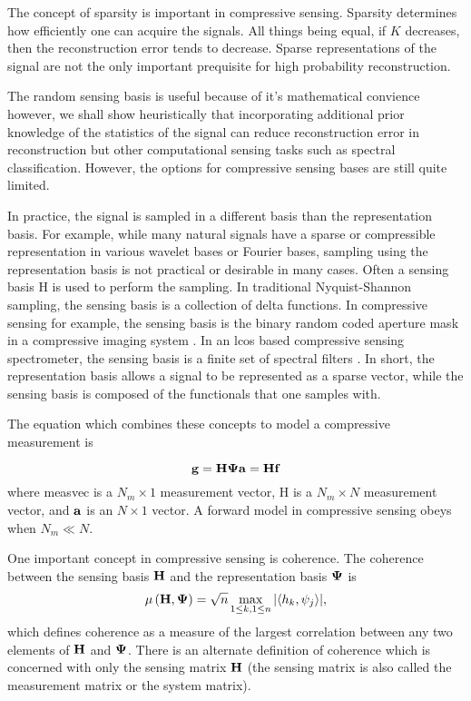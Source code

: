 The concept of \gls{sparsity} is important in compressive sensing. Sparsity determines how efficiently one can acquire the signals. All things being equal, if $K$ decreases, then the reconstruction error tends to decrease. Sparse representations of the signal are not the only important prequisite for high probability reconstruction.

The random sensing basis is useful because of it's mathematical convience however, we shall show heuristically that incorporating additional prior knowledge of the statistics of the signal can reduce reconstruction error in reconstruction but other computational sensing tasks such as spectral classification. However, the options for compressive sensing bases are still quite limited.

In practice, the signal is sampled in a different basis than the representation basis. For example, while many natural signals have a sparse or compressible representation in various wavelet bases or Fourier bases, sampling using the representation basis is not practical or desirable in many cases. Often a sensing basis \gls{H} is used to perform the sampling. In traditional Nyquist-Shannon sampling, the sensing basis is a collection of delta functions. In compressive sensing for example, the sensing basis is the binary random coded aperture mask in a compressive imaging system \cite{duarte2008single}. In an \gls{lcos} based compressive sensing spectrometer, the sensing basis is a finite set of spectral filters \cite{oiknine2016along, yuan2015compressive}. In short, the representation basis allows a signal to be represented as a sparse vector, while the sensing basis is composed of the functionals that one samples with.

The equation which combines these concepts to model a compressive measurement is

\begin{equation}
	\mathbf{g} = \mathbf{H} \mathbf{\Psi} \mathbf{a} = \mathbf{H} \mathbf{f}
	\label{eq:gHf2}
\end{equation}
where \gls{measvec} is a $N_m \times 1$ measurement vector, \gls{H} is a $N_m \times N$ measurement vector, and $\mathbf{a}$ is an $N \times 1$ vector. A forward model in compressive sensing obeys  when $N_m \ll N$. 

One important concept in \gls{compressive sensing} is coherence. The coherence between the sensing basis $\mathbf{H}$ and the representation basis $\mathbf{\Psi}$ is
\begin{equation}
	\mu \left( \mathbf{H}, \mathbf{\Psi} \right) = \sqrt{n} \max_{1 \leq k, 1 \leq n}  | \langle h_k, \psi_j \rangle | ,
	\label{eq:coherenceDef1}
\end{equation}
which defines coherence as a measure of the largest correlation between any two elements of $\mathbf{H}$ and $\mathbf{\Psi}$. There is an alternate definition of coherence which is concerned with only the sensing matrix $\mathbf{H}$ (the sensing matrix is also called the measurement matrix or the system matrix).

